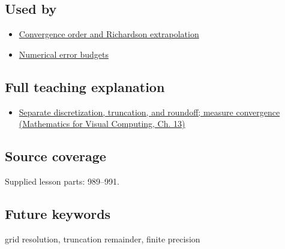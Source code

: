 \subsection{Used by}\label{appendix-6b0648b2b8e8-used-by}

\hypertarget{appendix-6b0648b2b8e8-used-by}{}

\begin{itemize}
\tightlist
\item
  \hyperref[appendix-aca80b6bf17a]{Convergence order and Richardson extrapolation}
\item
  \hyperref[appendix-31b8c295e05f]{Numerical error budgets}
\end{itemize}

\subsection{Full teaching explanation}\label{appendix-6b0648b2b8e8-full-teaching-explanation}

\hypertarget{appendix-6b0648b2b8e8-full-teaching-explanation}{}

\begin{itemize}
\tightlist
\item
  \href{../02-Mathematics-for-Visual-Computing/main.pdf\#nameddest=02-foundations-ii-ch029-separate-discretization-truncation-and-roundoff-measure-convergence}{Separate discretization, truncation, and roundoff; measure convergence (Mathematics for Visual Computing, Ch. 13)}
\end{itemize}

\subsection{Source coverage}\label{appendix-6b0648b2b8e8-source-coverage}

\hypertarget{appendix-6b0648b2b8e8-source-coverage}{}

Supplied lesson parts: 989--991.

\subsection{Future keywords}\label{appendix-6b0648b2b8e8-future-keywords}

\hypertarget{appendix-6b0648b2b8e8-future-keywords}{}

grid resolution, truncation remainder, finite precision
